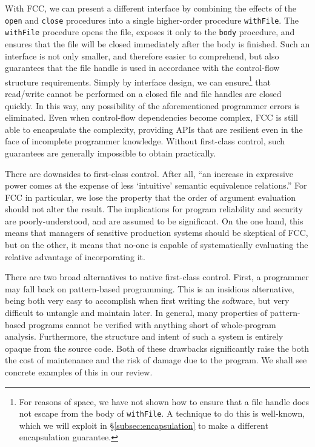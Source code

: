 \documentclass[11pt]{article}
\begin{document}
With FCC, we can present a different interface by combining the effects of the \texttt{open} and \texttt{close} procedures into a single higher-order procedure \texttt{withFile}.
The \texttt{withFile} procedure opens the file, exposes it only to the \texttt{body} procedure, and ensures that the file will be closed immediately after the body is finished.
Such an interface is not only smaller, and therefore easier to comprehend, but also guarantees that the file handle is used in accordance with the control-flow structure requirements.
Simply by interface design, we can ensure\footnote{For reasons of space, we have not shown how to ensure that a file handle does not escape from the body of \texttt{withFile}. A technique to do this is well-known\cite{StateInHaskell}, which we will exploit in \S\ref{subsec:encapsulation} to make a different encapsulation guarantee.} that read/write cannot be performed on a closed file and file handles are closed quickly.
In this way, any possibility of the aforementioned programmer errors is eliminated.
Even when control-flow dependencies become complex, FCC is still able to encapsulate the complexity, providing APIs that are resilient even in the face of incomplete programmer knowledge.
Without first-class control, such guarantees are generally impossible to obtain practically.


There are downsides to first-class control. After all, ``an increase in expressive power comes at the expense of less `intuitive' semantic equivalence relations.''\cite{Felleisen90expressive}
For FCC in particular, we lose the property that the order of argument evaluation should not alter the result.
The implications for program reliability and security are poorly-understood, and are assumed to be significant.
On the one hand, this means that managers of sensitive production systems should be skeptical of FCC, but on the other, it means that no-one is capable of systematically evaluating the relative advantage of incorporating it.

There are two broad alternatives to native first-class control.
First, a programmer may fall back on pattern-based programming.
This is an insidious alternative, being both very easy to accomplish when first writing the software, but very difficult to untangle and maintain later.
In general, many properties of pattern-based programs cannot be verified with anything short of whole-program analysis.
Furthermore, the structure and intent of such a system is entirely opaque from the source code.\cite{Felleisen90expressive}
Both of these drawbacks significantly raise the both the cost of maintenance and the risk of damage due to the program.
We shall see concrete examples of this in our review.
\end{document}
